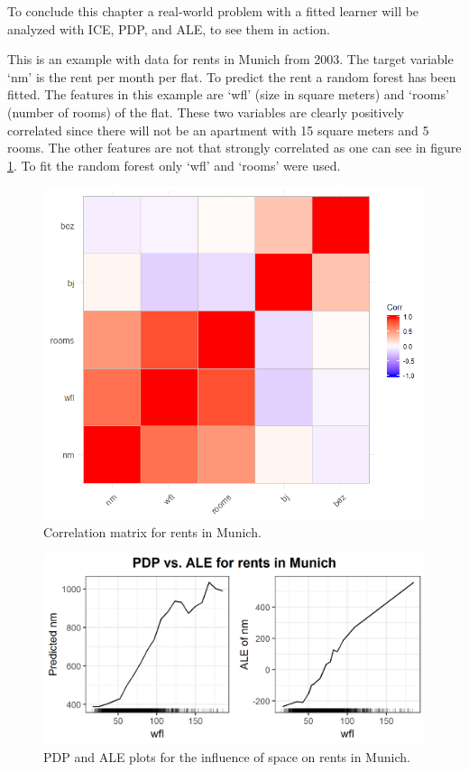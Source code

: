 \documentclass[]{krantz}
\begin{document}
To conclude this chapter a real-world problem with a fitted learner will
be analyzed with ICE, PDP, and ALE, to see them in action.

This is an example with data for rents in Munich from 2003. The target
variable `nm' is the rent per month per flat. To predict the rent a
random forest has been fitted. The features in this example are `wfl'
(size in square meters) and `rooms' (number of rooms) of the flat. These
two variables are clearly positively correlated since there will not be
an apartment with 15 square meters and 5 rooms. The other features are
not that strongly correlated as one can see in figure
\ref{fig:correlationMatrixRents}. To fit the random forest only `wfl'
and `rooms' were used.

\begin{figure}
\includegraphics[width=1\linewidth]{images/ale_1_correlation_munich_rents} \caption{Correlation matrix for rents in Munich.}\label{fig:correlationMatrixRents}
\end{figure}



\begin{figure}
\includegraphics[width=1\linewidth]{images/ale_1_rf_rent_for_rooms_and_wfl} \caption{PDP and ALE plots for the influence of space on
rents in Munich.}\label{fig:pdpaleRents}
\end{figure}
\end{document}
